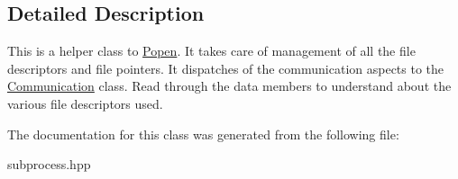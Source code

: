 \subsection{Detailed Description}
This is a helper class to \hyperlink{classsubprocess_1_1Popen}{Popen}. It takes care of management of all the file descriptors and file pointers. It dispatches of the communication aspects to the \hyperlink{classsubprocess_1_1detail_1_1Communication}{Communication} class. Read through the data members to understand about the various file descriptors used. 

The documentation for this class was generated from the following file\+:\begin{DoxyCompactItemize}
\item 
subprocess.\+hpp\end{DoxyCompactItemize}

